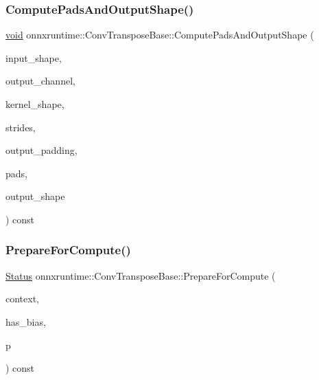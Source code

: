 \subsubsection{\texorpdfstring{Compute\+Pads\+And\+Output\+Shape()}{ComputePadsAndOutputShape()}}
{\footnotesize\ttfamily \mbox{\hyperlink{mlasi_8h_a88f941d423cb2a819b70a1358982b1a6}{void}} onnxruntime\+::\+Conv\+Transpose\+Base\+::\+Compute\+Pads\+And\+Output\+Shape (\begin{DoxyParamCaption}\item[{const \mbox{\hyperlink{classonnxruntime_1_1TensorShape}{Tensor\+Shape}}}]{input\+\_\+shape,  }\item[{const int64\+\_\+t}]{output\+\_\+channel,  }\item[{const std\+::vector$<$ int64\+\_\+t $>$ \&}]{kernel\+\_\+shape,  }\item[{const std\+::vector$<$ int64\+\_\+t $>$ \&}]{strides,  }\item[{const std\+::vector$<$ int64\+\_\+t $>$ \&}]{output\+\_\+padding,  }\item[{std\+::vector$<$ int64\+\_\+t $>$ $\ast$}]{pads,  }\item[{std\+::vector$<$ int64\+\_\+t $>$ $\ast$}]{output\+\_\+shape }\end{DoxyParamCaption}) const\hspace{0.3cm}{\ttfamily [protected]}}

\mbox{\label{classonnxruntime_1_1ConvTransposeBase_ab2d71cbaa44e9f6ee1437e319ebb191a}} 
\subsubsection{\texorpdfstring{Prepare\+For\+Compute()}{PrepareForCompute()}}
{\footnotesize\ttfamily \mbox{\hyperlink{classonnxruntime_1_1common_1_1Status}{Status}} onnxruntime\+::\+Conv\+Transpose\+Base\+::\+Prepare\+For\+Compute (\begin{DoxyParamCaption}\item[{\mbox{\hyperlink{classonnxruntime_1_1OpKernelContext}{Op\+Kernel\+Context}} $\ast$}]{context,  }\item[{bool}]{has\+\_\+bias,  }\item[{\mbox{\hyperlink{structonnxruntime_1_1ConvTransposeBase_1_1Prepare}{Conv\+Transpose\+Base\+::\+Prepare}} \&}]{p }\end{DoxyParamCaption}) const\hspace{0.3cm}{\ttfamily [protected]}}



